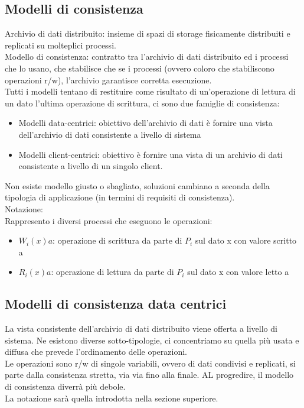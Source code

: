 \documentclass[16px]{article}
\begin{document}
\subsection{Modelli di consistenza}
Archivio di dati distribuito: insieme di spazi di storage fisicamente distribuiti e replicati su molteplici processi.\\ Modello di consistenza: contratto tra l'archivio di dati distribuito ed i processi che lo usano, che stabilisce che se i processi (ovvero coloro che stabiliscono operazioni r/w), l'archivio garantisce corretta esecuzione.\\ Tutti i modelli tentano di restituire come risultato di un'operazione di lettura di un dato l'ultima operazione di scrittura,  ci sono due famiglie di consistenza:
\begin{itemize}
\item Modelli data-centrici: obiettivo dell'archivio di dati è fornire una vista dell'archivio di dati consistente a livello di sistema
\item Modelli client-centrici: obiettivo è fornire una vista di un archivio di dati consistente a livello di un singolo client.
\end{itemize}
Non esiste modello giusto o sbagliato, soluzioni cambiano a seconda della tipologia di applicazione (in termini di requisiti di consistenza).\\ Notazione:\\
Rappresento i diversi processi che eseguono le operazioni:
\begin{itemize}
\item $W_i(x)a$: operazione di scrittura da parte di $P_i$ sul dato x con valore scritto a
\item $R_i(x)a$: operazione di lettura da parte di $P_i$ sul dato x con valore letto a
\end{itemize}
\subsection{Modelli di consistenza data centrici}
La vista consistente dell'archivio di dati distribuito viene offerta a livello di sistema. Ne esistono diverse sotto-tipologie, ci concentriamo su quella più usata e diffusa che prevede l'ordinamento delle operazioni.\\ Le operazioni sono r/w di singole variabili, ovvero di dati condivisi e replicati, si parte dalla consistenza stretta, via via fino alla finale. AL progredire, il modello di consistenza diverrà più debole.\\ La notazione sarà quella introdotta nella sezione superiore. 
\end{document}
